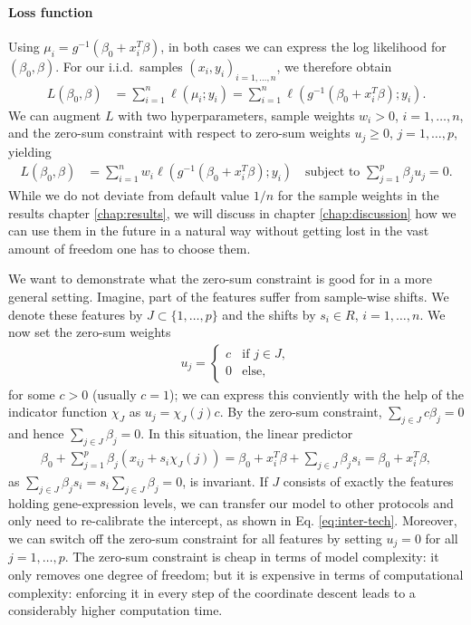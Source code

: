 \paragraph{Loss function}
Using $\mu_i = g^{-1}(\beta_0 + x_i^T \beta)$, in both cases we can express the 
log likelihood 
for $(\beta_0, \beta)$. For our i.i.d.\ samples $(x_i, y_i)_{i = 1, \ldots, n}$, we therefore obtain 
\begin{align}
    L(\beta_0, \beta) &= \sum_{i=1}^n \ell(\mu_i; y_i) 
    = \sum_{i=1}^n \ell\left( g^{-1}\left( \beta_0 + x_i^T \beta \right); y_i \right).
\end{align}
We can augment $L$ with two hyperparameters, sample weights $w_i > 0$, $i = 1, \ldots, n$, and the 
zero-sum constraint with respect to zero-sum weights $u_j \geq 0$, $j = 1, \ldots, p$, yielding 
\begin{align} \label{eq:loss-glm-no-lasso}
    L(\beta_0, \beta) &= \sum_{i=1}^n w_i \ell\left( g^{-1}\left( \beta_0 + x_i^T \beta \right); 
    y_i \right) \quad \text{subject to } \sum_{j=1}^p \beta_j u_j = 0.
\end{align}
While we do not deviate from default value $1/n$ for the sample weights in the results chapter 
\ref{chap:results}, we will discuss in chapter \ref{chap:discussion} how we can use them in the 
future in a natural way without getting lost in the vast amount of freedom one has to choose them.

We want to demonstrate what the zero-sum constraint is good for in a more general setting. Imagine, 
part of the features suffer from sample-wise 
shifts. We denote these features by $J \subset \{1, \ldots, p\}$ and the shifts by $s_i \in R$, 
$i = 1, \ldots, n$. We now set the zero-sum weights  
\begin{align}
    u_j =
    \begin{cases}
        c & \text{if } j \in J, \\
        0 & \text{else},
    \end{cases}
\end{align}
for some $c > 0$ (usually $c = 1$); we can express this conviently with the help of the indicator 
function $\chi_J$ as $u_j = \chi_J(j) c$. By the zero-sum constraint, $\sum_{j \in J} c \beta_j = 0$  
and hence $\sum_{j \in J} \beta_j = 0$. In this situation, the linear predictor 
\begin{align}
    \beta_0 + \sum_{j=1}^p \beta_j (x_{ij} + s_i \chi_J(j))
    = \beta_0 + x_i^T \beta + \sum_{j \in J} \beta_j s_i = \beta_0 + x_i^T \beta,
\end{align}
as $\sum_{j \in J} \beta_j s_i = s_i \sum_{j \in J} \beta_j = 0$, is invariant. If $J$ consists of 
exactly the features holding gene-expression levels, we can transfer our model to other protocols 
and only need to re-calibrate the intercept, as shown in Eq. \eqref{eq:inter-tech}. Moreover, we 
can switch off the zero-sum constraint for all features by setting $u_j = 0$ for all 
$j = 1, \ldots, p$. The zero-sum constraint is cheap in terms of model complexity: it only removes 
one degree of freedom; but it is expensive in terms of computational complexity: enforcing it in
every step of the coordinate descent leads to a considerably higher computation time. 

